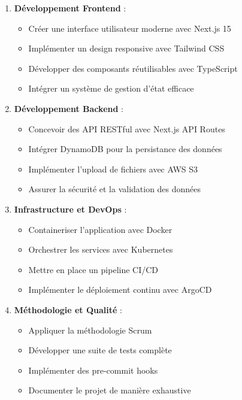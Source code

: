 \begin{enumerate}
    \item \textbf{Développement Frontend} :
    \begin{itemize}
        \item Créer une interface utilisateur moderne avec Next.js 15
        \item Implémenter un design responsive avec Tailwind CSS
        \item Développer des composants réutilisables avec TypeScript
        \item Intégrer un système de gestion d'état efficace
    \end{itemize}
    
    \item \textbf{Développement Backend} :
    \begin{itemize}
        \item Concevoir des API RESTful avec Next.js API Routes
        \item Intégrer DynamoDB pour la persistance des données
        \item Implémenter l'upload de fichiers avec AWS S3
        \item Assurer la sécurité et la validation des données
    \end{itemize}
    
    \item \textbf{Infrastructure et DevOps} :
    \begin{itemize}
        \item Containeriser l'application avec Docker
        \item Orchestrer les services avec Kubernetes
        \item Mettre en place un pipeline CI/CD
        \item Implémenter le déploiement continu avec ArgoCD
    \end{itemize}
    
    \item \textbf{Méthodologie et Qualité} :
    \begin{itemize}
        \item Appliquer la méthodologie Scrum
        \item Développer une suite de tests complète
        \item Implémenter des pre-commit hooks
        \item Documenter le projet de manière exhaustive
    \end{itemize}
\end{enumerate}

